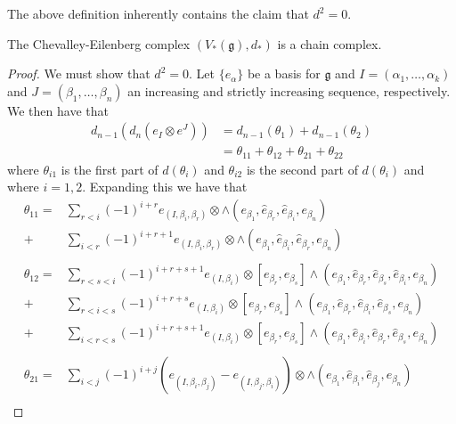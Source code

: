 The above definition inherently contains the claim that $ d^2 = 0 $.
\begin{claim}
  The Chevalley-Eilenberg complex $ (V_*(\mathfrak{g}), d_*) $ is a chain complex.
\end{claim}
\begin{proof}
  We must show that $ d^2 = 0 $. Let $ \{e_{\alpha}\} $ be a basis for $ \mathfrak{g} $ and $ I = (\alpha_1, \ldots, \alpha_k) $ and $ J = (\beta_1, \ldots, \beta_n) $ an increasing and strictly increasing sequence, respectively. We then have that
  \begin{align*}
    d_{n - 1}(d_n(e_I \otimes e^J)) &= d_{n - 1}(\theta_1) + d_{n-1}(\theta_2) \\
                                    &= \theta_{11} + \theta_{12} + \theta_{21} + \theta_{22}
  \end{align*}
  where $ \theta_{i1} $ is the first part of $ d(\theta_i) $ and $ \theta_{i2} $ is the second part of $ d(\theta_{i}) $ and where $ i = 1,2 $. Expanding this we have that
  \begin{align*}
    \theta_{11} = &\sum_{r < i} (-1)^{i + r} e_{(I, \beta_i, \beta_r)} \otimes \wedge(e_{\beta_1}, \widehat{e}_{\beta_r}, \widehat{e}_{\beta_i}, e_{\beta_n}) \\
    + &\sum_{i < r} (-1)^{i + r + 1} e_{(I, \beta_i, \beta_r)} \otimes \wedge(e_{\beta_1}, \widehat{e}_{\beta_i}, \widehat{e}_{\beta_{r}}, e_{\beta_n}) \\
    \\
    \theta_{12} = &\sum_{r < s < i} (-1)^{i + r + s + 1} e_{(I, \beta_i)} \otimes [e_{\beta_r}, e_{\beta_s}] \wedge (e_{\beta_1}, \widehat{e}_{\beta_r}, \widehat{e}_{\beta_s}, \widehat{e}_{\beta_i}, e_{\beta_n}) \\
                  +&\sum_{r < i < s} (-1)^{i + r + s} e_{(I, \beta_i)} \otimes [e_{\beta_r}, e_{\beta_s}] \wedge (e_{\beta_1}, \widehat{e}_{\beta_r}, \widehat{e}_{\beta_i}, \widehat{e}_{\beta_s}, e_{\beta_n}) \\
                  +&\sum_{i < r < s} (-1)^{i + r + s + 1} e_{(I, \beta_i)} \otimes [e_{\beta_r}, e_{\beta_s}] \wedge (e_{\beta_1}, \widehat{e}_{\beta_i}, \widehat{e}_{\beta_r}, \widehat{e}_{\beta_s}, e_{\beta_n}) \\
                  \\
  \theta_{21} = & \sum_{i < j} (-1)^{i + j} (e_{(I, \beta_i, \beta_j)} - e_{(I, \beta_j, \beta_i)}) \otimes \wedge(e_{\beta_1}, \widehat{e}_{\beta_i}, \widehat{e}_{\beta_j}, e_{\beta_n}) \\

\end{align*}
\end{proof}
